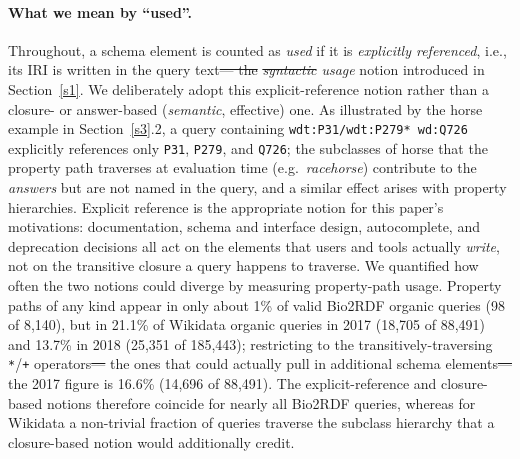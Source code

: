 \documentclass[sw]{iosart2x}
\providecommand{\DIFadd}[1]{{\protect\color{blue}\uwave{#1}}} %
\providecommand{\DIFdel}[1]{{\protect\color{red}\sout{#1}}} %
\providecommand{\DIFaddbegin}{} %
\providecommand{\DIFaddend}{} %
\providecommand{\DIFdelbegin}{} %
\providecommand{\DIFdelend}{} %
\providecommand{\DIFscaledelfig}{0.5}
\newlength{\DIFdelgraphicswidth} %
\newlength{\DIFdelgraphicsheight} %
\providecommand{\DIFaddincludegraphics}[2][]{{\color{blue}\fbox{\DIFOincludegraphics[#1]{#2}}}} %
\providecommand{\DIFdelincludegraphics}[2][]{%
\sbox{\DIFdelgraphicsbox}{\DIFOincludegraphics[#1]{#2}}%
\settoboxwidth{\DIFdelgraphicswidth}{\DIFdelgraphicsbox} %
\settoboxtotalheight{\DIFdelgraphicsheight}{\DIFdelgraphicsbox} %
\scalebox{\DIFscaledelfig}{%
\parbox[b]{\DIFdelgraphicswidth}{\usebox{\DIFdelgraphicsbox}\\[-\baselineskip] \rule{\DIFdelgraphicswidth}{0em}}\llap{\resizebox{\DIFdelgraphicswidth}{\DIFdelgraphicsheight}{%
\setlength{\unitlength}{\DIFdelgraphicswidth}%
\begin{picture}(1,1)%
\thicklines\linethickness{2pt} %
{\color[rgb]{1,0,0}\put(0,0){\framebox(1,1){}}}%
{\color[rgb]{1,0,0}\put(0,0){\line( 1,1){1}}}%
{\color[rgb]{1,0,0}\put(0,1){\line(1,-1){1}}}%
\end{picture}%
}\hspace*{3pt}}} %
} %
\DeclareRobustCommand{\DIFaddbegin}{\DIFOaddbegin \let\includegraphics\DIFaddincludegraphics} %
\DeclareRobustCommand{\DIFaddend}{\DIFOaddend \let\includegraphics\DIFOincludegraphics} %
\DeclareRobustCommand{\DIFdelbegin}{\DIFOdelbegin \let\includegraphics\DIFdelincludegraphics} %
\DeclareRobustCommand{\DIFdelend}{\DIFOaddend \let\includegraphics\DIFOincludegraphics} %
\begin{document}
\paragraph{\textbf{What we mean by ``used''.}} Throughout, a schema element is counted as \emph{used} if it is \emph{explicitly referenced}, i.e., its IRI is written in the query text\DIFdelbegin \DIFdel{--- the }\DIFdelend \DIFaddbegin \DIFadd{, the }\DIFaddend \emph{\DIFdelbegin \DIFdel{syntactic }\DIFdelend \DIFaddbegin \DIFadd{explicit }\DIFaddend usage} notion introduced in Section~\ref{s1}. We deliberately adopt this explicit-reference notion rather than a closure- or answer-based (\emph{semantic}, effective) one. As illustrated by the horse example in Section~\ref{s3}.2, a query containing \texttt{wdt:P31/wdt:P279* wd:Q726} explicitly references only \texttt{P31}, \texttt{P279}, and \texttt{Q726}; the subclasses of horse that the property path traverses at evaluation time (e.g.\ \emph{racehorse}) contribute to the \emph{answers} but are not named in the query, and a similar effect arises with property hierarchies. Explicit reference is the appropriate notion for this paper's motivations: documentation, schema and interface design, autocomplete, and deprecation decisions all act on the elements that users and tools actually \emph{write}, not on the transitive closure a query happens to traverse. We quantified how often the two notions could diverge by measuring property-path usage. Property paths of any kind appear in only about 1\% of valid Bio2RDF organic queries (98 of 8,140), but in 21.1\% of Wikidata organic queries in 2017 (18,705 of 88,491) and 13.7\% in 2018 (25,351 of 185,443); restricting to the transitively-traversing \texttt{*}/\texttt{+} operators\DIFdelbegin \DIFdel{--- }\DIFdelend \DIFaddbegin \DIFadd{, }\DIFaddend the ones that could actually pull in additional schema elements\DIFdelbegin \DIFdel{--- }\DIFdelend \DIFaddbegin \DIFadd{, }\DIFaddend the 2017 figure is 16.6\% (14,696 of 88,491). The explicit-reference and closure-based notions therefore coincide for nearly all Bio2RDF queries, whereas for Wikidata a non-trivial fraction of queries traverse the subclass hierarchy that a closure-based notion would additionally credit.
\end{document}
